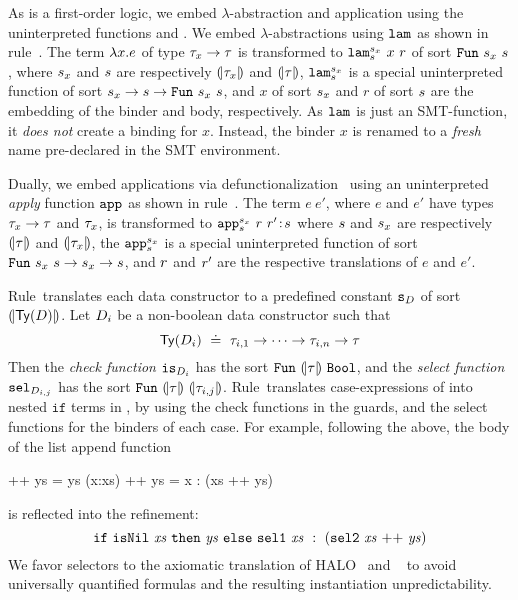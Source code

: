 %
As \smtlan is a first-order logic, we
embed $\lambda$-abstraction and application
using the uninterpreted functions
\smtlamname{}{} and \smtappname{}{}.
%
We embed $\lambda$-abstractions
using $\texttt{lam}^{}_{}$ as shown in rule~\lgfun.
%
The term $\lambda x. e$ of type
${\tau_x \rightarrow \tau}$ is transformed
to
${\smtlamname{\sort_x}{\sort}\ x\ \pred}$
of sort
${\mathtt{Fun}\ {s_x}\ {s}}$, where
%
$s_x$ and $s$ are respectively
$(\!|\tau_x|\!)$ and $(\!|\tau|\!)$,
%
${\texttt{lam}^{s_x}_{s}}$
is a special uninterpreted function
of sort
${s_x \rightarrow s\rightarrow\mathtt{Fun}\ {s_x}\ {s}}$,
and
$x$ of sort $s_x$ and $r$ of sort $s$ are
the embedding of the binder and body, respectively.
%
As $\texttt{lam}^{}_{}$ is just an SMT-function,
it \emph{does not} create a binding for $x$.
%
Instead, the binder $x$ is renamed to
a \emph{fresh} name pre-declared in
the SMT environment.


%
Dually, we embed applications via
defunctionalization~\citep{Reynolds72}
using an uninterpreted \emph{apply}
function
$\texttt{app}^{}_{}$ as shown in rule~\lgapp.
%
The term ${e\ e'}$, where $e$ and $e'$ have
types ${\tau_x \rightarrow \tau}$ and $\tau_x$,
is transformed to
${\tbind{\smtappname{\sort_x}{\sort}\ \pred\ \pred'}{\sort}}$
where
%
$s$ and $s_x$ are respectively $(\!|\tau|\!)$ and $(\!|\tau_x|\!)$,
the
${\texttt{app}^{s_x}_{s}}$
is a special uninterpreted function of sort
${\mathtt{Fun}\ {s_x}\ {s} \rightarrow s_x \rightarrow s}$,
and
$r$ and $r'$ are the respective translations of $e$ and $e'$.


%
Rule~\lgdc translates each data constructor to a
predefined \smtlan constant ${\texttt{s}_{D}}$ of
sort ${(\!|\mathsf{Ty}({D})|\!)}$.
%
Let $D_i$ be a non-boolean data constructor such that
$$
\mathsf{Ty}({D_i}) \ \doteq\  \tau_{i,1} \rightarrow \dots \rightarrow \tau_{i,n} \rightarrow \tau
$$
Then the \emph{check function}
${\texttt{is}_{{D_i}}}$ has the sort
$\mathtt{Fun}\ {(\!|\tau|\!)}\ {\texttt{Bool}}$,
and the \emph{select function}
${\texttt{sel}_{{D}_{i,j}}}$ has the sort
$\mathtt{Fun}\ {(\!|\tau|\!)}\ {(\!|\tau_{i,j}|\!)}$.
%
Rule~\lgcase translates case-expressions
of \corelan into nested $\mathtt{if}$
terms in \smtlan, by using the check
functions in the guards, and the
select functions for the binders
of each case.
%
%
%
For example, following the above, the body of the list append function
%
\begin{code}
  []     ++ ys = ys
  (x:xs) ++ ys = x : (xs ++ ys)
\end{code}
%
is reflected into the \smtlan refinement:
%
$$
\ite{\mathtt{isNil}\ \mathit{xs}}
    {\mathit{ys}}
    {\mathtt{sel1}\ \mathit{xs}\
       \dcons\
       (\mathtt{sel2}\ \mathit{xs} \ \mathtt{++}\  \mathit{ys})}
$$
%
We favor selectors to the axiomatic translation of
HALO~\citep{HALO} and \fstar~\cite{fstar} to avoid
universally quantified formulas and the resulting
instantiation unpredictability.


